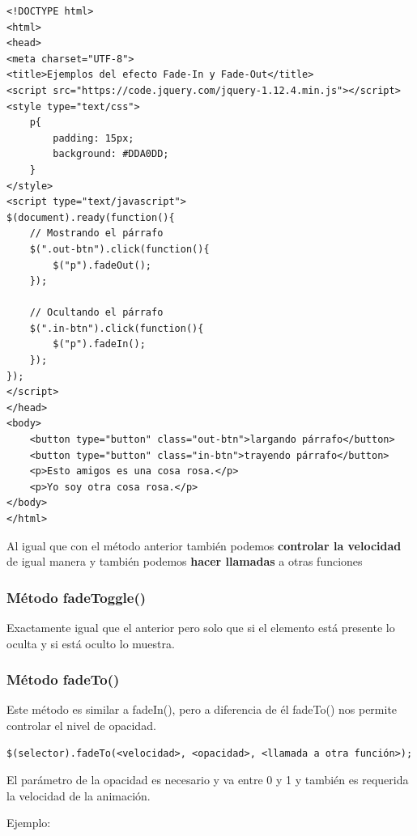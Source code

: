 \documentclass[11pt]{article}
\begin{document}
\begin{verbatim}
<!DOCTYPE html>
<html>
<head>
<meta charset="UTF-8">
<title>Ejemplos del efecto Fade-In y Fade-Out</title>
<script src="https://code.jquery.com/jquery-1.12.4.min.js"></script>
<style type="text/css">
    p{
        padding: 15px;
        background: #DDA0DD;
    }
</style>
<script type="text/javascript">
$(document).ready(function(){
    // Mostrando el párrafo
    $(".out-btn").click(function(){
        $("p").fadeOut();
    });

    // Ocultando el párrafo
    $(".in-btn").click(function(){
        $("p").fadeIn();
    });
});
</script>
</head>
<body>
    <button type="button" class="out-btn">largando párrafo</button>
    <button type="button" class="in-btn">trayendo párrafo</button>
    <p>Esto amigos es una cosa rosa.</p>
    <p>Yo soy otra cosa rosa.</p>
</body>
</html>                                		                                		
\end{verbatim}

Al igual que con el método anterior también podemos \textbf{controlar la velocidad} de igual manera y también podemos \textbf{hacer llamadas} a otras funciones

\subsubsection*{Método fadeToggle()}
\label{sec:org84eb7e6}

Exactamente igual que el anterior pero solo que si el elemento está presente lo oculta y si está oculto lo muestra.

\subsubsection*{Método fadeTo()}
\label{sec:org1a31301}

Este método es similar a fadeIn(), pero a diferencia de él fadeTo() nos permite controlar el nivel de opacidad. 

\begin{verbatim}
$(selector).fadeTo(<velocidad>, <opacidad>, <llamada a otra función>);
\end{verbatim}

El parámetro de la opacidad es necesario y va entre 0  y 1 y también es requerida la velocidad de la animación.

Ejemplo:
\end{document}
